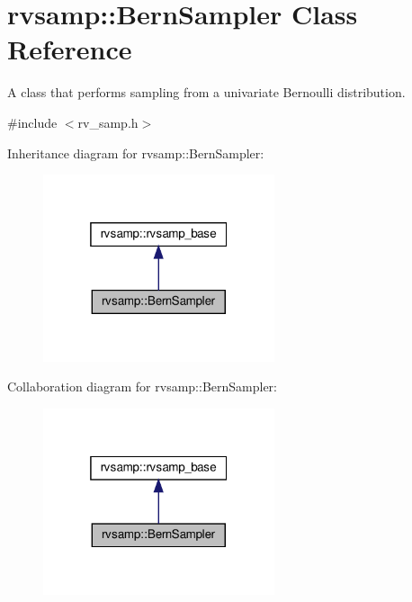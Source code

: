 \hypertarget{classrvsamp_1_1BernSampler}{}\section{rvsamp\+:\+:Bern\+Sampler Class Reference}
\label{classrvsamp_1_1BernSampler}


A class that performs sampling from a univariate Bernoulli distribution.  




{\ttfamily \#include $<$rv\+\_\+samp.\+h$>$}



Inheritance diagram for rvsamp\+:\+:Bern\+Sampler\+:
\nopagebreak
\begin{figure}[H]
\begin{center}
\leavevmode
\includegraphics[width=193pt]{classrvsamp_1_1BernSampler__inherit__graph}
\end{center}
\end{figure}


Collaboration diagram for rvsamp\+:\+:Bern\+Sampler\+:
\nopagebreak
\begin{figure}[H]
\begin{center}
\leavevmode
\includegraphics[width=193pt]{classrvsamp_1_1BernSampler__coll__graph}
\end{center}
\end{figure}
